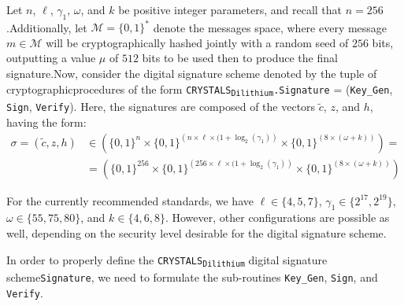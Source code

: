 \documentclass[runningheads]{llncs}
\numberwithin{equation}{section}
\begin{document}
    Let $n$, $\ell$, ${\gamma}_{1}$, $\omega$, and $k$ be positive integer parameters, and recall that $n = 256$.\break Additionally, let $\mathcal{M} = { \{ 0 , 1 \} }^{*}$ denote the messages space, where every message\break $m \in \mathcal{M}$ will be cryptographically hashed jointly with a random seed of $256$ bits, outputting a value $\mu$ of $512$ bits to be used then to produce the final signature.\break Now, consider the digital signature scheme denoted by the tuple of cryptographic\break procedures of the form \texorpdfstring{\texttt{CRYSTALS}\textsubscript{\texttt{Dilithium}}\texttt{.Signature} = \big(\texttt{Key\_Gen}, \texttt{Sign}, \texttt{Verify}\big)}\/. Here, the signatures are composed of the vectors $\tilde{c}$, $z$, and $h$, having the form:
    \begin{equation*}
        \begin{split}
            \sigma = (\tilde{c}, z, h)& \in \left( { \{ 0, 1 \} }^{n} \times { \{ 0, 1 \} }^{\left( n \times \ell \times (1 + \log_{2}({\gamma}_{1}) \right) } \times { \{ 0, 1 \} }^{\left( 8 \times ( \omega + k ) \right) } \right) = \\
            & = \left( { \{ 0, 1 \} }^{256} \times { \{ 0, 1 \} }^{\left( 256 \times \ell \times (1 + \log_{2}({\gamma}_{1}) \right) } \times { \{ 0, 1 \} }^{\left( 8 \times ( \omega + k ) \right) } \right)
        \end{split}
    \end{equation*}
    
    \noindent For the currently recommended standards, we have $\ell \in \{4,5,7\}$, ${\gamma}_{1} \in \{ {2}^{17}, {2}^{19} \}$, $\omega \in \{ 55, 75, 80 \}$, and $k \in \{4,6,8\}$. However, other configurations are possible as well, depending on the security level desirable for the digital signature scheme.

    \vspace{1ex}

    \noindent In order to properly define the \texorpdfstring{\texttt{CRYSTALS}\textsubscript{\texttt{Dilithium}}}\/ digital signature scheme\break \texttt{Signature}, we need to formulate the sub-routines \texttt{Key\_Gen}, \texttt{Sign}, and \texttt{Verify}.

    \clearpage
    
\end{document}
